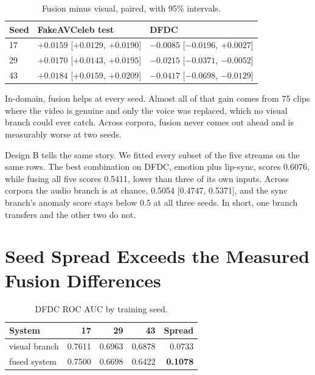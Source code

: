 \begin{table}[ht]
    \centering
    \caption{Fusion minus visual, paired, with 95\% intervals.}
    \label{tab:fusion}
    \begin{tabular}{lll}
        \toprule
        \textbf{Seed} & \textbf{FakeAVCeleb test} & \textbf{DFDC} \\
        \midrule
        17 & $+0.0159$ [$+0.0129$, $+0.0190$] & $-0.0085$ [$-0.0196$, $+0.0027$] \\
        29 & $+0.0170$ [$+0.0143$, $+0.0195$] & $-0.0215$ [$-0.0371$, $-0.0052$] \\
        43 & $+0.0184$ [$+0.0159$, $+0.0209$] & $-0.0417$ [$-0.0698$, $-0.0129$] \\
        \bottomrule
    \end{tabular}
\end{table}

In-domain, fusion helps at every seed. Almost all of that gain comes from 75
clips where the video is genuine and only the voice was replaced, which no
visual branch could ever catch. Across corpora, fusion never comes out ahead
and is measurably worse at two seeds.

Design B tells the same story. We fitted every subset of the five streams on
the same rows. The best combination on DFDC, emotion plus lip-sync, scores
0.6076, while fusing all five scores 0.5411, lower than three of its own
inputs. Across corpora the audio branch is at chance, 0.5054 [0.4747, 0.5371],
and the sync branch's anomaly score stays below 0.5 at all three seeds. In
short, one branch transfers and the other two do not.

\section{Seed Spread Exceeds the Measured Fusion Differences}

\begin{table}[ht]
    \centering
    \caption{DFDC ROC AUC by training seed.}
    \label{tab:seeds}
    \begin{tabular}{lrrrr}
        \toprule
        \textbf{System} & \textbf{17} & \textbf{29} & \textbf{43} & \textbf{Spread} \\
        \midrule
        visual branch & 0.7611 & 0.6963 & 0.6878 & 0.0733 \\
        fused system & 0.7500 & 0.6698 & 0.6422 & \textbf{0.1078} \\
        \bottomrule
    \end{tabular}
\end{table}

